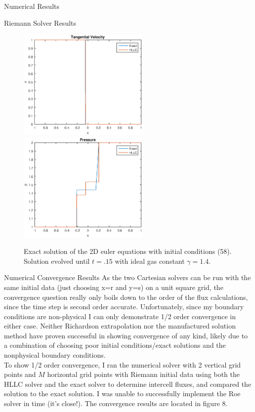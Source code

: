 \begin{section}{Numerical Results}
\begin{subsection}{Riemann Solver Results}
\begin{figure}[h]
\includegraphics[width=2.5in]{tubeV}
\includegraphics[width=2.5in]{tubeP}
\caption{Exact solution of the 2D euler equations with initial conditions (58). Solution evolved until $t=.15$ with ideal gas constant $\gamma=1.4.$}
\end{figure}
\end{subsection}
\begin{subsection}{Numerical Convergence Results}
As the two Cartesian solvers can be run with the same initial data (just choosing x=r and y=s) on a unit square grid, the convergence question really only boils down to the order of the flux calculations, since the time step is second order accurate. Unfortunately, since my boundary conditions are non-physical I can only demonstrate 1/2 order convergence in either case. Neither Richardson extrapolation nor the manufactured solution method have proven successful in showing convergence of any kind, likely due to a combination of choosing poor initial conditions/exact solutions and the nonphysical boundary conditions.\\
To show 1/2 order convergence, I ran the numerical solver with 2 vertical grid points and $M$ horizontal grid points with Riemann initial data using both the HLLC solver and the exact solver to determine intercell fluxes, and compared the solution to the exact solution. I was unable to successfully implement the Roe solver in time (it's close!). The convergence results are located in figure 8. 
\begin{figure}[hb]

\end{figure}
\end{subsection}
\end{section}
